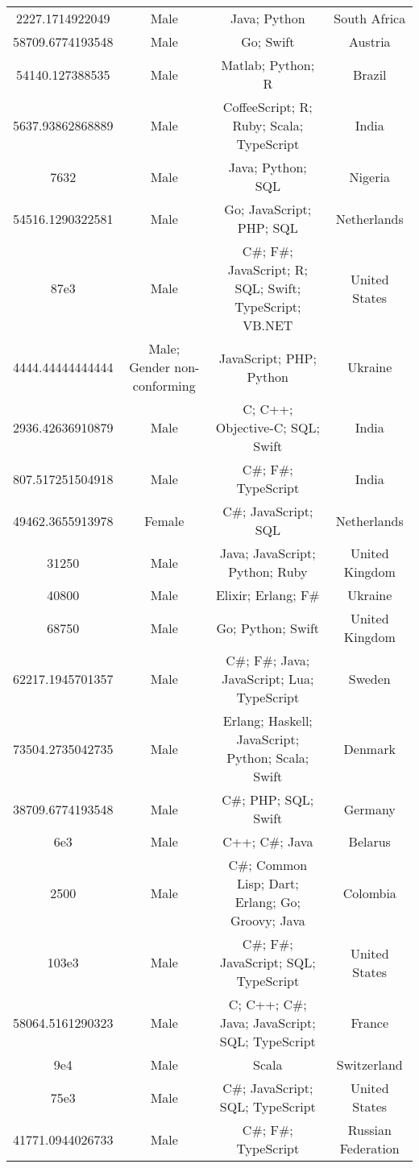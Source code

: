 \begin{center}
\begin{tabular}{ |c|c|c|c| }
2227.1714922049  &  Male  &  Java; Python  &  South Africa  \\ 
58709.6774193548  &  Male  &  Go; Swift  &  Austria  \\ 
54140.127388535  &  Male  &  Matlab; Python; R  &  Brazil  \\ 
5637.93862868889  &  Male  &  CoffeeScript; R; Ruby; Scala; TypeScript  &  India  \\ 
7632  &  Male  &  Java; Python; SQL  &  Nigeria  \\ 
54516.1290322581  &  Male  &  Go; JavaScript; PHP; SQL  &  Netherlands  \\ 
87e3  &  Male  &  C\#; F\#; JavaScript; R; SQL; Swift; TypeScript; VB.NET  &  United States  \\ 
4444.44444444444  &  Male; Gender non-conforming  &  JavaScript; PHP; Python  &  Ukraine  \\ 
2936.42636910879  &  Male  &  C; C++; Objective-C; SQL; Swift  &  India  \\ 
807.517251504918  &  Male  &  C\#; F\#; TypeScript  &  India  \\ 
49462.3655913978  &  Female  &  C\#; JavaScript; SQL  &  Netherlands  \\ 
31250  &  Male  &  Java; JavaScript; Python; Ruby  &  United Kingdom  \\ 
40800  &  Male  &  Elixir; Erlang; F\#  &  Ukraine  \\ 
68750  &  Male  &  Go; Python; Swift  &  United Kingdom  \\ 
62217.1945701357  &  Male  &  C\#; F\#; Java; JavaScript; Lua; TypeScript  &  Sweden  \\ 
73504.2735042735  &  Male  &  Erlang; Haskell; JavaScript; Python; Scala; Swift  &  Denmark  \\ 
38709.6774193548  &  Male  &  C\#; PHP; SQL; Swift  &  Germany  \\ 
6e3  &  Male  &  C++; C\#; Java  &  Belarus  \\ 
2500  &  Male  &  C\#; Common Lisp; Dart; Erlang; Go; Groovy; Java  &  Colombia  \\ 
103e3  &  Male  &  C\#; F\#; JavaScript; SQL; TypeScript  &  United States  \\ 
58064.5161290323  &  Male  &  C; C++; C\#; Java; JavaScript; SQL; TypeScript  &  France  \\ 
9e4  &  Male  &  Scala  &  Switzerland  \\ 
75e3  &  Male  &  C\#; JavaScript; SQL; TypeScript  &  United States  \\ 
41771.0944026733  &  Male  &  C\#; F\#; TypeScript  &  Russian Federation  \\ 

\end{tabular}
\end{center}
